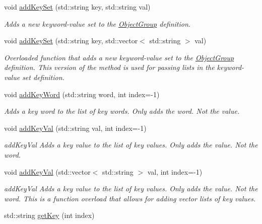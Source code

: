 \begin{DoxyCompactItemize}
void \hyperlink{classosea_1_1_object_group_a83f133e49aa52b4b649872def6d77260}{add\-Key\-Set} (std\-::string key, std\-::string val)
\begin{DoxyCompactList}\small\item\em Adds a new keyword-\/value set to the \hyperlink{classosea_1_1_object_group}{Object\-Group} definition. \end{DoxyCompactList}\item 
void \hyperlink{classosea_1_1_object_group_a6cd45569ea88e9363894e1c14d8ed09b}{add\-Key\-Set} (std\-::string key, std\-::vector$<$ std\-::string $>$ val)
\begin{DoxyCompactList}\small\item\em Overloaded function that adds a new keyword-\/value set to the \hyperlink{classosea_1_1_object_group}{Object\-Group} definition. This version of the method is used for passing lists in the keyword-\/value set definition. \end{DoxyCompactList}\item 
void \hyperlink{classosea_1_1_object_group_a8bd69589a25fe6a666ae71e926c0a9d0}{add\-Key\-Word} (std\-::string word, int index=-\/1)
\begin{DoxyCompactList}\small\item\em Adds a key word to the list of key words. Only adds the word. Not the value. \end{DoxyCompactList}\item 
void \hyperlink{classosea_1_1_object_group_a7340f605d054830056666531e748093a}{add\-Key\-Val} (std\-::string val, int index=-\/1)
\begin{DoxyCompactList}\small\item\em add\-Key\-Val Adds a key value to the list of key values. Only adds the value. Not the word. \end{DoxyCompactList}\item 
void \hyperlink{classosea_1_1_object_group_ac8f27751c5a2a53c23b6333d69fae28b}{add\-Key\-Val} (std\-::vector$<$ std\-::string $>$ val, int index=-\/1)
\begin{DoxyCompactList}\small\item\em add\-Key\-Val Adds a key value to the list of key values. Only adds the value. Not the word. This is a function overload that allows for adding vector lists of key values. \end{DoxyCompactList}\item 
std\-::string \hyperlink{classosea_1_1_object_group_a818bd77a51e5617fb26481d09eb16714}{get\-Key} (int index)

\end{DoxyCompactItemize}
